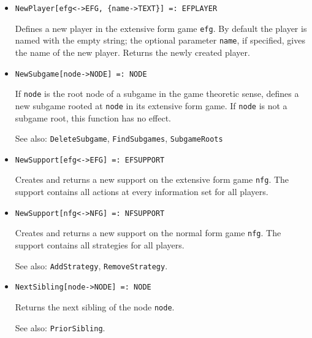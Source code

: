 \begin{itemize}
\item
\protect \large \begin{verbatim}
NewPlayer[efg<->EFG, {name->TEXT}] =: EFPLAYER 
\end{verbatim}\normalsize

\bd
Defines a new player in the extensive form game \verb+efg+.
By default the player is named with the empty string; the optional parameter
\verb+name+, if specified, gives the name of the new player.  Returns the
newly created player.
\ed

\item
\protect \large \begin{verbatim}
NewSubgame[node->NODE] =: NODE
\end{verbatim}\normalsize

\bd
If \verb+node+ is the root node of a subgame in the game theoretic
sense, defines a new subgame rooted at \verb+node+ in its extensive
form game.  If \verb+node+ is not a subgame root, this function has
no effect.
\item
[See also:] {\tt DeleteSubgame}, {\tt FindSubgames}, {\tt SubgameRoots}
\ed

\item
\protect \large \begin{verbatim}
NewSupport[efg<->EFG] =: EFSUPPORT
\end{verbatim}\normalsize

\bd
Creates and returns a new support on the extensive form
game \verb+nfg+.  The support contains all actions at every
information set for all players.
\ed

\item
\protect \large \begin{verbatim}
NewSupport[nfg<->NFG] =: NFSUPPORT
\end{verbatim}\normalsize

\bd
Creates and returns a new support on the normal form
game \verb+nfg+.  The support contains all strategies for all players.
\item
[See also:] {\tt AddStrategy}, {\tt RemoveStrategy}.
\ed

\item
\protect \large \begin{verbatim}
NextSibling[node->NODE] =: NODE
\end{verbatim}\normalsize

\bd
Returns the next sibling of the node \verb+node+.
\item
[See also:] {\tt PriorSibling}.
\ed


\end{itemize}
